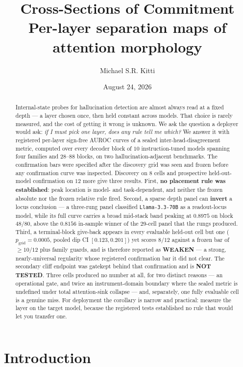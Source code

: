 \documentclass[10pt, letterpaper]{article}
\title{Cross-Sections of Commitment\\
\large Per-layer separation maps of attention morphology}
\author[ ]{Michael S.R. Kitti}
\affil[ ]{Furnace Research (independent) \quad \texttt{msrkittty@proton.me}}
\date{August 24, 2026}
\begin{document}
\maketitle

\begin{abstract}
Internal-state probes for hallucination detection are almost always read at a
fixed depth --- a layer chosen once, then held constant across models. That
choice is rarely measured, and the cost of getting it wrong is unknown. We ask
the question a deployer would ask: \emph{if I must pick one layer, does any rule
tell me which?} We answer it with registered per-layer sign-free AUROC curves of
a sealed inter-head-disagreement metric, computed over every decoder block of
$10$ instruction-tuned models spanning four families and $28$--$88$ blocks, on
two hallucination-adjacent benchmarks. The confirmation bars were specified
after the discovery grid was seen and frozen before any confirmation curve was
inspected. Discovery on $8$ cells and prospective held-out-model confirmation on
$12$ more give three results. First, \textbf{no placement rule was established}: peak location is
model- and task-dependent, and neither the frozen absolute nor the frozen
relative rule fired. Second, a sparse depth panel can \textbf{invert} a locus
conclusion --- a three-rung panel classified \texttt{Llama-3.3-70B} as a
readout-locus model, while its full curve carries a broad mid-stack band peaking
at $0.8975$ on block $48/80$, above the $0.8156$ in-sample winner of the $29$-cell
panel that the rungs produced. Third, a terminal-block give-back appears in every
evaluable held-out cell but one ($p_{\mathrm{grid}}=0.0005$, pooled dip CI
$[0.123, 0.201]$) yet scores $8/12$ against a frozen bar of $\geq 10/12$ plus
family guards, and is therefore reported as \textbf{WEAKEN} --- a strong,
nearly-universal regularity whose registered confirmation bar it did not clear.
The secondary cliff endpoint was gatekept behind that confirmation and is
\textbf{NOT TESTED}. Three cells produced no number at all, for two distinct
reasons --- an operational gate, and twice an instrument-domain boundary where
the sealed metric is undefined under total attention-sink collapse --- and,
separately, one fully evaluable cell is a genuine miss. For deployment
the corollary is narrow and practical: measure the layer on the target model,
because the registered tests established no rule that would let you transfer one.
\end{abstract}

\section{Introduction}
\label{sec:intro}
\end{document}
